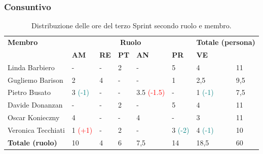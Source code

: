 \subsubsection{Consuntivo}
\begin{table}[ht!]
	\centering
	\begin{tabular}{p{3cm} p{1.4cm} p{1.6cm} p{1.7cm} p{1.4cm} p{1.4cm} p{1.5cm} p{2cm}}
		\toprule
        \textbf{Membro} & \multicolumn{5}{c}{\textbf{Ruolo}} & \multicolumn{2}{r}{\textbf{Totale (persona)}}\\
		& \textbf{AM} & \textbf{RE} & \textbf{PT} & \textbf{AN} & \textbf{PR} & \textbf{VE}\\
		\midrule
        Linda Barbiero     & - & - & 2 & -   & 5 & 4 & 11 \\
        Gugliemo Barison   & 2 & 4 & - & -   & 1 & 2,5 & 9,5 \\
        Pietro Busato      & 3 \textcolor{teal}{(-1)} & - & - & 3.5
        \textcolor{red}{(-1.5)} & - & 1 \textcolor{teal}{(-1)} & 7,5 \\
        Davide Donanzan    & - & - & 2 & -   & 5 & 4 & 11 \\
        Oscar Konieczny    & 4 & - & - & 4   & - & 3 & 11 \\
        Veronica Tecchiati & 1 \textcolor{red}{(+1)} & -  & 2 & -   & 3 \textcolor{teal}{(-2)} & 4
        \textcolor{teal}{(-1)}  & 10 \\
        \midrule
        \textbf{Totale (ruolo)} & 10 & 4 & 6 & 7,5 & 14 & 18,5 & 60 \\
		\bottomrule
	\end{tabular}
	\caption{Distribuzione delle ore del terzo Sprint secondo ruolo e membro.}
	\label{table:Distribuzione delle ore del terzo Sprint secondo ruolo e membr}
\end{table}
